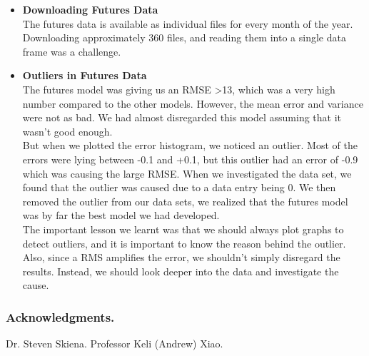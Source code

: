 \documentclass[runningheads]{llncs}
\begin{document}
\begin{itemize}
\item \textbf{Downloading Futures Data} \\
The futures data is available as individual files for every month of the year. Downloading approximately 360 files, and reading them into a single data frame was a challenge. 

\item \textbf{Outliers in Futures Data} \\
The futures model was giving us an RMSE >13, which was a very high number compared to the other models. However, the mean error and variance were not as bad. We had almost disregarded this model assuming that it wasn't good enough. \\

But when we plotted the error histogram, we noticed an outlier. Most of the errors were lying between -0.1 and +0.1, but this outlier had an error of -0.9 which was causing the large RMSE. When we investigated the data set, we found that the outlier was caused due to a data entry being 0. We then removed the outlier from our data sets, we realized that the futures model was by far the best model we had developed. \\

The important lesson we learnt was that we should always plot graphs to detect outliers, and it is important to know the reason behind the outlier. Also, since a RMS amplifies the error, we shouldn't simply disregard the results. Instead, we should look deeper into the data and investigate the cause. 
\end{itemize}



\subsubsection*{Acknowledgments.} Dr. Steven Skiena. Professor Keli (Andrew) Xiao.
\end{document}
